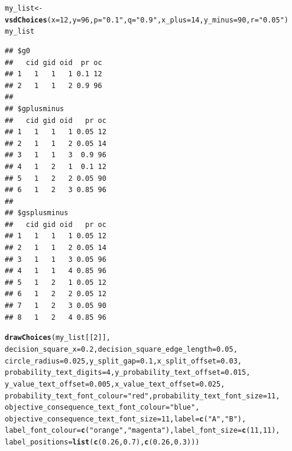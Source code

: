 \documentclass{article}\usepackage[]{graphicx}\usepackage[]{color}
\makeatletter
\newcommand{\hlnum}[1]{\textcolor[rgb]{0.686,0.059,0.569}{#1}}%
\newcommand{\hlstr}[1]{\textcolor[rgb]{0.192,0.494,0.8}{#1}}%
\newcommand{\hlstd}[1]{\textcolor[rgb]{0.345,0.345,0.345}{#1}}%
\newcommand{\hlkwb}[1]{\textcolor[rgb]{0.69,0.353,0.396}{#1}}%
\newcommand{\hlkwc}[1]{\textcolor[rgb]{0.333,0.667,0.333}{#1}}%
\newcommand{\hlkwd}[1]{\textcolor[rgb]{0.737,0.353,0.396}{\textbf{#1}}}%
\newenvironment{kframe}{%
 \def\at@end@of@kframe{}%
 \ifinner\ifhmode%
  \def\at@end@of@kframe{\end{minipage}}%
  \begin{minipage}{\columnwidth}%
 \fi\fi%
 \def\FrameCommand##1{\hskip\@totalleftmargin \hskip-\fboxsep
 \colorbox{shadecolor}{##1}\hskip-\fboxsep
     \hskip-\linewidth \hskip-\@totalleftmargin \hskip\columnwidth}%
 \MakeFramed {\advance\hsize-\width
   \@totalleftmargin\z@ \linewidth\hsize
   \@setminipage}}%
 {\par\unskip\endMakeFramed%
 \at@end@of@kframe}
\newenvironment{knitrout}{}{} %
\makeatother
\begin{document}
\begin{knitrout}
\color{fgcolor}\begin{kframe}
\begin{alltt}
\hlstd{my_list} \hlkwb{<-} \hlkwd{vsdChoices}\hlstd{(}\hlkwc{x}\hlstd{=}\hlnum{12}\hlstd{,} \hlkwc{y}\hlstd{=}\hlnum{96}\hlstd{,} \hlkwc{p}\hlstd{=}\hlstr{"0.1"}\hlstd{,} \hlkwc{q}\hlstd{=}\hlstr{"0.9"}\hlstd{,} \hlkwc{x_plus}\hlstd{=}\hlnum{14}\hlstd{,} \hlkwc{y_minus}\hlstd{=}\hlnum{90}\hlstd{,} \hlkwc{r}\hlstd{=}\hlstr{"0.05"}\hlstd{)}
\hlstd{my_list}
\end{alltt}
\begin{verbatim}
## $g0
##   cid gid oid  pr oc
## 1   1   1   1 0.1 12
## 2   1   1   2 0.9 96
## 
## $gplusminus
##   cid gid oid   pr oc
## 1   1   1   1 0.05 12
## 2   1   1   2 0.05 14
## 3   1   1   3  0.9 96
## 4   1   2   1  0.1 12
## 5   1   2   2 0.05 90
## 6   1   2   3 0.85 96
## 
## $gsplusminus
##   cid gid oid   pr oc
## 1   1   1   1 0.05 12
## 2   1   1   2 0.05 14
## 3   1   1   3 0.05 96
## 4   1   1   4 0.85 96
## 5   1   2   1 0.05 12
## 6   1   2   2 0.05 12
## 7   1   2   3 0.05 90
## 8   1   2   4 0.85 96
\end{verbatim}
\begin{alltt}
\hlkwd{drawChoices}\hlstd{(my_list[[}\hlnum{2}\hlstd{]],}
        \hlkwc{decision_square_x}\hlstd{=}\hlnum{0.2}\hlstd{,} \hlkwc{decision_square_edge_length}\hlstd{=}\hlnum{0.05}\hlstd{,}
        \hlkwc{circle_radius}\hlstd{=}\hlnum{0.025}\hlstd{,} \hlkwc{y_split_gap}\hlstd{=}\hlnum{0.1}\hlstd{,} \hlkwc{x_split_offset}\hlstd{=}\hlnum{0.03}\hlstd{,}
        \hlkwc{probability_text_digits}\hlstd{=}\hlnum{4}\hlstd{,} \hlkwc{y_probability_text_offset}\hlstd{=}\hlnum{0.015}\hlstd{,}
        \hlkwc{y_value_text_offset}\hlstd{=}\hlnum{0.005}\hlstd{,} \hlkwc{x_value_text_offset}\hlstd{=}\hlnum{0.025}\hlstd{,}
        \hlkwc{probability_text_font_colour}\hlstd{=}\hlstr{"red"}\hlstd{,} \hlkwc{probability_text_font_size}\hlstd{=}\hlnum{11}\hlstd{,}
        \hlkwc{objective_consequence_text_font_colour}\hlstd{=}\hlstr{"blue"}\hlstd{,}
        \hlkwc{objective_consequence_text_font_size}\hlstd{=}\hlnum{11}\hlstd{,} \hlkwc{label}\hlstd{=}\hlkwd{c}\hlstd{(}\hlstr{"A"}\hlstd{,}\hlstr{"B"}\hlstd{),}
        \hlkwc{label_font_colour}\hlstd{=}\hlkwd{c}\hlstd{(}\hlstr{"orange"}\hlstd{,}\hlstr{"magenta"}\hlstd{),} \hlkwc{label_font_size}\hlstd{=}\hlkwd{c}\hlstd{(}\hlnum{11}\hlstd{,}\hlnum{11}\hlstd{),}
        \hlkwc{label_positions}\hlstd{=}\hlkwd{list}\hlstd{(}\hlkwd{c}\hlstd{(}\hlnum{0.26}\hlstd{,}\hlnum{0.7}\hlstd{),}\hlkwd{c}\hlstd{(}\hlnum{0.26}\hlstd{,}\hlnum{0.3}\hlstd{)))}
\end{alltt}
\end{kframe}


\end{knitrout}
\end{document}
